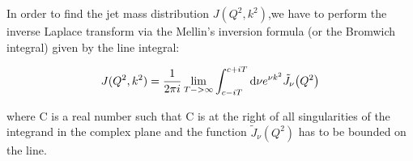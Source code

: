 \documentclass[../main.tex]{subfiles}
\begin{document}
In order to find the jet mass distribution $J(Q^2,k^2)$,we have to perform the inverse Laplace transform via 
the Mellin's inversion formula (or the Bromwich integral) given by the line integral: 

\begin{equation} \label{eq:inverse_laplace}
    J(Q^2,k^2) = \frac{1}{2\pi i} \lim_{T->\infty}\int_{c-iT}^{c+iT} \dd \nu e^{\nu k^2} \tilde{J}_\nu \qty(Q^2)
\end{equation}

where C is a real number such that C is at the right of all singularities of the integrand in the complex plane and
the function $\tilde{J}_\nu(Q^2)$ has to be bounded on the line.  
\end{document}
